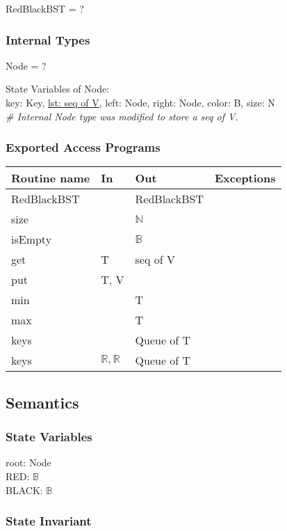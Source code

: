 \documentclass[12pt]{article}
\begin{document}
RedBlackBST = ?

\subsubsection* {Internal Types}

Node = ?

\noindent State Variables of Node:\\
key: Key,
\underline {lst: seq of V},
left: Node,
right: Node,
color: B,
size: N\\

\noindent \textit{\# Internal Node type was modified to store a seq of V.}

\subsubsection* {Exported Access Programs}

\begin{tabular}{| l | l | l | l |}
\hline
\textbf{Routine name} & \textbf{In} & \textbf{Out} & \textbf{Exceptions}\\
\hline
RedBlackBST & ~ & RedBlackBST & \\
\hline
size & ~ & $\mathbb{N}$ & ~\\
\hline
isEmpty & ~ & $\mathbb{B}$ & ~\\
\hline
get & T & seq of V & ~\\
\hline
put & T, V & ~ & ~\\
\hline
min & ~ & T & ~\\
\hline
max & ~ & T & ~\\
\hline
keys & ~ & Queue of T & ~\\
\hline
keys & $\mathbb{R}, \mathbb{R}$ & Queue of T & ~\\
\hline
\end{tabular}

\subsection* {Semantics}

\subsubsection* {State Variables}

root: Node\\
RED: $\mathbb{B}$\\
BLACK: $\mathbb{B}$

\subsubsection* {State Invariant}
\end{document}
